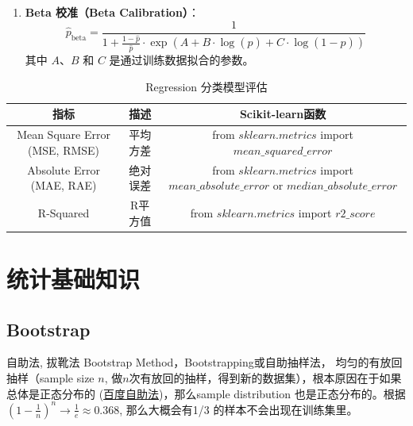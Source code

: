 \documentclass[12pt]{article}
\numberwithin{theorem}{section} %
\numberwithin{definition}{section} %
\numberwithin{assumption}{section} %
\numberwithin{lemma}{section} %
\numberwithin{remark}{section} %
\numberwithin{prop}{section} %
\numberwithin{corollary}{section} %
\numberwithin{example}{section} %
\numberwithin{question}{section} %
\numberwithin{problem}{section} %
\numberwithin{conjecture}{section} %
\numberwithin{append}{section} %
\numberwithin{property}{section} %
\newcommand{\ra}[1]{\renewcommand{\arraystretch}{#1}}
\begin{document}
\begin{CJK}{UTF8}{gbsn}
\begin{itemize}
\begin{enumerate}
\begin{enumerate}
			\item \textbf{Beta 校准（Beta Calibration）}：
			\begin{equation}
				\hat{p}_{\text{beta}} = \frac{1}{1 + \frac{1-\hat{p}}{\hat{p}} \cdot \exp(A + B \cdot \log(\hat{p}) + C \cdot \log(1-\hat{p}))}
			\end{equation}
			其中 \( A \)、\( B \) 和 \( C \) 是通过训练数据拟合的参数。
			\end{enumerate}
		\end{enumerate}
	
\end{itemize}

	
	\begin{table}[h]\centering
		\caption{Regression 分类模型评估}
		\label{Regression Evaluation}
		\ra{1.1}
		\begin{tabular}{@{}ccc@{}}
			\toprule
			指标&  描述 & Scikit-learn函数 \\
			\midrule
			Mean Square Error (MSE, RMSE) &  平均方差 & from $sklearn.metrics$ import $mean\_squared\_error$\\
			Absolute Error (MAE, RAE) &  绝对误差 & from $sklearn.metrics$ import $mean\_absolute\_error$ or $median\_absolute\_error$\\
			R-Squared &  R平方值 & from $sklearn.metrics$ import $r2\_score$\\
			\bottomrule
		\end{tabular}
	\end{table}

\section{统计基础知识}

\subsection{Bootstrap}
自助法, 拔靴法 Bootstrap Method，Bootstrapping或自助抽样法， 均匀的有放回抽样（sample size $n$, 做$n$次有放回的抽样，得到新的数据集），根本原因在于如果总体是正态分布的
(\href{}{百度自助法})，那么sample distribution 也是正态分布的。根据 $(1-\frac{1}{n})^n\to \frac{1}{e}\approx 0.368$, 那么大概会有1/3 的样本不会出现在训练集里。


\end{CJK}
\end{document}
